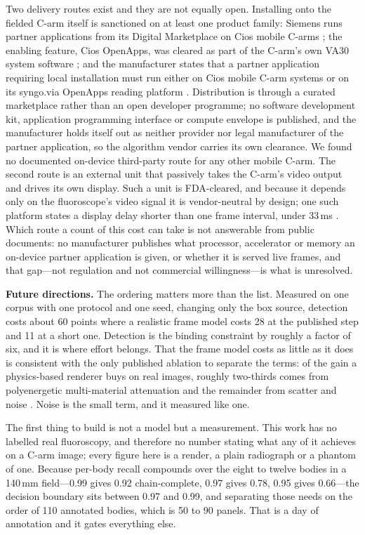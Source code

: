\documentclass[11pt,letterpaper]{article}
\begin{document}
Two delivery routes exist and they are not equally open. Installing onto the fielded C-arm itself is
sanctioned on at least one product family: Siemens runs partner applications from its Digital
Marketplace on Cios mobile C-arms \citep{ciosopenapps}; the enabling feature, Cios OpenApps, was cleared
as part of the C-arm's own VA30 system software \citep{k181560,k203504}; and the manufacturer states
that a partner application requiring local installation must run either on Cios mobile C-arm systems
or on its syngo.via OpenApps reading platform \citep{ciosopenapps}. Distribution is through a curated marketplace rather than an open developer
programme; no software development kit, application programming interface or compute envelope is
published, and the manufacturer holds itself out as neither provider nor legal manufacturer of the
partner application, so the algorithm vendor carries its own clearance. We found no documented on-device
third-party route for any other mobile C-arm. The second route is an external unit that passively
takes the C-arm's video output and drives its own display. Such a unit is FDA-cleared, and because it
depends only on the fluoroscope's video signal it is vendor-neutral by design; one such platform states a
display delay shorter than one frame interval, under 33\,ms \citep{k180038}. Which route a count of this cost can take is not answerable from public documents: no
manufacturer publishes what processor, accelerator or memory an on-device partner application is given,
or whether it is served live frames, and that gap---not regulation and not commercial willingness---is
what is unresolved.

\textbf{Future directions.} The ordering matters more than the list. Measured on one corpus with one
protocol and one seed, changing only the box source, detection costs about 60 points where a realistic
frame model costs 28 at the published step and 11 at a short one. Detection is the binding constraint by
roughly a factor of six, and it is where effort belongs. That the frame model costs as little as it does
is consistent with the only published ablation to separate the terms: of the gain a physics-based
renderer buys on real images, roughly two-thirds comes from polyenergetic multi-material attenuation and
the remainder from scatter and noise \citep{unberath2019}. Noise is the small term, and it measured
like one.

The first thing to build is not a model but a measurement. This work has no labelled real fluoroscopy,
and therefore no number stating what any of it achieves on a C-arm image; every figure here is a render,
a plain radiograph or a phantom of one. Because per-body recall compounds over the eight to twelve bodies
in a 140\,mm field---0.99 gives 0.92 chain-complete, 0.97 gives 0.78, 0.95 gives 0.66---the decision
boundary sits between 0.97 and 0.99, and separating those needs on the order of 110 annotated bodies,
which is 50 to 90 panels. That is a day of annotation and it gates everything else.
\end{document}
